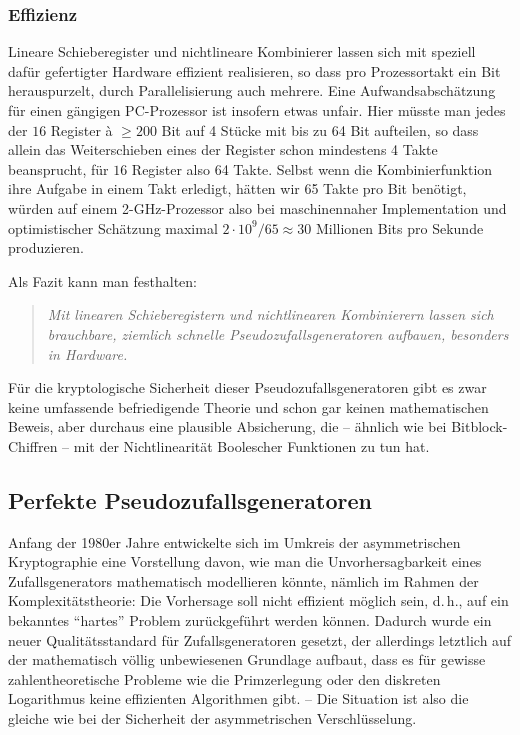 \begin{refsegment}
\subsubsection*{Effizienz}

Lineare Schieberegister
und nichtlineare Kombinierer lassen sich mit
speziell dafür gefertigter Hardware effizient realisieren, so dass pro
Prozessortakt ein Bit herauspurzelt, durch Parallelisierung auch
mehrere. Eine Aufwandsabschätzung für einen gängigen PC-Prozessor
ist insofern etwas unfair. Hier müsste man jedes der $16$ Register
à $\geq 200$ Bit auf 4 Stücke mit bis zu 64 Bit aufteilen, so dass
allein das Weiterschieben eines der Register schon mindestens 4 Takte
beansprucht, für $16$ Register also 64 Takte. Selbst wenn die
Kombinierfunktion ihre Aufgabe in einem Takt erledigt, hätten wir
65 Takte pro Bit benötigt, würden auf einem 2-GHz-Prozessor also
bei maschinennaher Implementation und optimistischer Schätzung
maximal $2 \cdot 10^9 / 65 \approx 30$ Millionen Bits pro Sekunde
produzieren.

Als Fazit kann man festhalten:
\begin{quote}
  {\em Mit linearen Schieberegistern und nichtlinearen Kombinierern
  lassen sich brauchbare, ziemlich schnelle
  Pseudozufallsgeneratoren
  aufbauen, besonders in Hardware.}
\end{quote}
Für die kryptologische Sicherheit dieser Pseudozufallsgeneratoren gibt es
zwar keine umfassende befriedigende Theorie und schon gar keinen mathematischen
Beweis, aber durchaus eine plausible Absicherung, die -- ähnlich wie
bei Bitblock-Chiffren -- mit der Nichtlinearität Boolescher
Funktionen zu tun hat.

\subsection{Perfekte Pseudozufallsgeneratoren}\label{ss-bool-rndperf}

Anfang der 1980er Jahre entwickelte sich im Umkreis der asymmetrischen
Kryptographie eine Vorstellung davon, wie man die Unvorhersagbarkeit eines
Zufallsgenerators mathematisch modellieren könnte,
nämlich im Rahmen der Komplexitätstheorie:
Die Vorhersage soll nicht effizient möglich sein,
d.\,h., auf ein bekanntes "`hartes"' Problem zurückgeführt werden können.
Dadurch wurde ein neuer Qualitätsstandard für Zufallsgeneratoren gesetzt,
der allerdings letztlich auf der mathematisch völlig unbewiesenen
Grundlage aufbaut, dass es für gewisse zahlentheoretische Probleme wie
die Primzerlegung oder den diskreten Logarithmus
 keine effizienten
Algorithmen gibt. -- Die Situation ist also die gleiche wie bei der
Sicherheit der asymmetrischen Verschlüsselung.


\end{refsegment}

